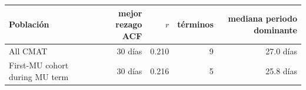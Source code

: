 \begin{tabular}{lrrrr}
\toprule
Población & mejor rezago ACF & $r$ & términos & mediana periodo dominante \\
\midrule
All CMAT & 30 días & 0.210 & 9 & 27.0 días \\
First-MU cohort during MU term & 30 días & 0.216 & 5 & 25.8 días \\
\bottomrule
\end{tabular}
